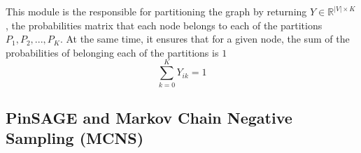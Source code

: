 This module is the responsible for partitioning the graph by returning $Y\in \mathbb R^{|V|\times K}$, the probabilities matrix that each node belongs to each of the partitions $P_1, P_2, ..., P_K$. At the same time, it ensures that for a given node, the sum of the probabilities of belonging each of the partitions is $1$
\begin{displaymath}
    \sum_{k=0}^K Y_{ik} = 1
\end{displaymath}



\subsection{PinSAGE and Markov Chain Negative Sampling (MCNS)}